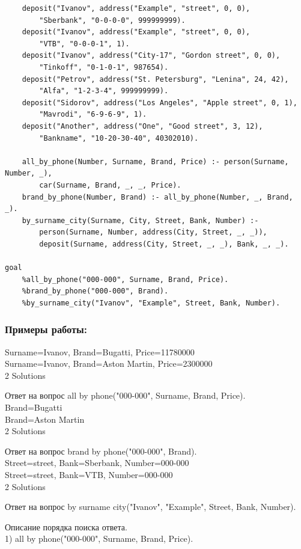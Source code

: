 \documentclass[a4paper, 12pt]{article}
\begin{document}
\begin{lstlisting}
	deposit("Ivanov", address("Example", "street", 0, 0), 
		"Sberbank", "0-0-0-0", 999999999).
	deposit("Ivanov", address("Example", "street", 0, 0), 
		"VTB", "0-0-0-1", 1).
	deposit("Ivanov", address("City-17", "Gordon street", 0, 0), 
		"Tinkoff", "0-1-0-1", 987654).
	deposit("Petrov", address("St. Petersburg", "Lenina", 24, 42), 
		"Alfa", "1-2-3-4", 999999999).
	deposit("Sidorov", address("Los Angeles", "Apple street", 0, 1), 
		"Mavrodi", "6-9-6-9", 1).
	deposit("Another", address("One", "Good street", 3, 12), 
		"Bankname", "10-20-30-40", 40302010).

	all_by_phone(Number, Surname, Brand, Price) :- person(Surname, Number, _), 
		car(Surname, Brand, _, _, Price).
	brand_by_phone(Number, Brand) :- all_by_phone(Number, _, Brand, _).
	by_surname_city(Surname, City, Street, Bank, Number) :- 
		person(Surname, Number, address(City, Street, _, _)), 
		deposit(Surname, address(City, Street, _, _), Bank, _, _).

goal
	%all_by_phone("000-000", Surname, Brand, Price).    
	%brand_by_phone("000-000", Brand).
	%by_surname_city("Ivanov", "Example", Street, Bank, Number).

\end{lstlisting}

\subsubsection*{Примеры работы:}
Surname=Ivanov, Brand=Bugatti, Price=11780000
\\Surname=Ivanov, Brand=Aston Martin, Price=2300000
\\2 Solutions

Ответ на вопрос all by phone("000-000", Surname, Brand, Price).
\\Brand=Bugatti
\\Brand=Aston Martin
\\2 Solutions

Ответ на вопрос brand by phone("000-000", Brand).
\\Street=street, Bank=Sberbank, Number=000-000
\\Street=street, Bank=VTB, Number=000-000
\\2 Solutions

Ответ на вопрос by surname city("Ivanov", "Example", Street, Bank, Number).

\clearpage
\newpage
Описание порядка поиска ответа.
\\ 1) all by phone("000-000", Surname, Brand, Price).
\end{document}
